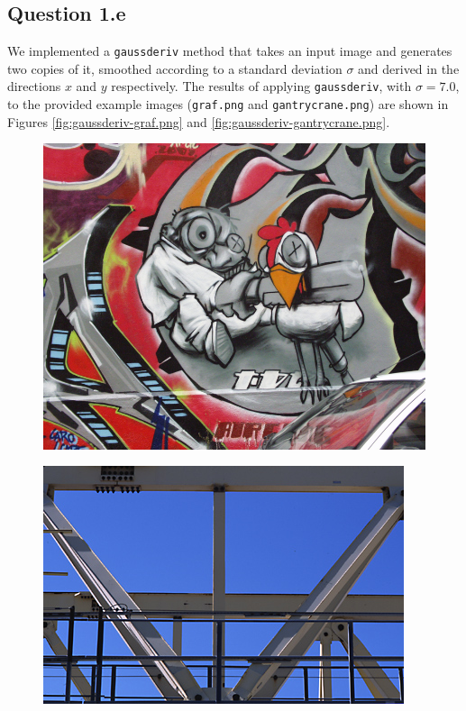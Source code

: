 \documentclass{article}
\begin{document}
\subsection{Question 1.e}
We implemented a \verb|gaussderiv| method that takes an input image and generates two copies of it, smoothed according to a standard deviation $\sigma$ and derived in the directions $x$ and $y$ respectively.
\newline
\newline
The results of applying \verb|gaussderiv|, with $\sigma = 7.0$, to the provided example images (\verb|graf.png| and \verb|gantrycrane.png|) are shown in Figures \ref{fig:gaussderiv-graf.png} and \ref{fig:gaussderiv-gantrycrane.png}.

\begin{figure}[ht]
    \centering
    \begin{minipage}{.5\textwidth}
      \centering
      \includegraphics[width=.6\linewidth]{images/Q1.e-graf.png}
      \label{fig:graf.png}
    \end{minipage}%
    \begin{minipage}{.5\textwidth}
      \centering
      \includegraphics[width=.6\linewidth]{images/Q1.e-gantrycrane.png}
      \label{fig:gantrycrane.png}
    \end{minipage}
\end{figure}
\end{document}
